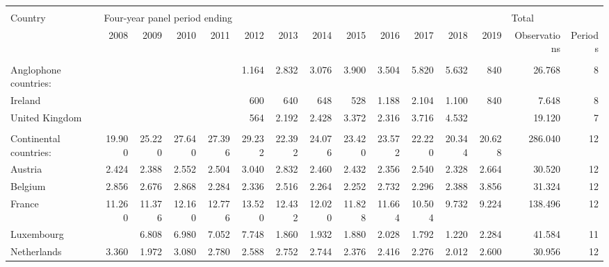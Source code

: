 \begin{tabular}{lrrrrrrrrrrrrrr}
   \\[-1.8ex]\hline \\ 
 [-1.8ex] \multicolumn{1}{l}{Country} & \multicolumn{12}{l}{Four-year panel period ending} & \multicolumn{2}{l}{Total} \\ 

                    \cmidrule(r){1-1} \cmidrule(r){2-13} \cmidrule(r){14-15} 

            & 2008 & 2009 & 2010 & 2011 & 2012 & 2013 & 2014 & 2015 & 2016 & 2017 & 2018 & 2019 & Observations & Periods \\ 
 \hline
\\[-1.8ex]
  Anglophone countries: &  &  &  &  & 1.164 & 2.832 & 3.076 & 3.900 & 3.504 & 5.820 & 5.632 & 840 & 26.768 &   8 \\ 
  \hspace{5mm} Ireland &  &  &  &  & 600 & 640 & 648 & 528 & 1.188 & 2.104 & 1.100 & 840 & 7.648 &   8 \\ 
  \hspace{5mm} United Kingdom &  &  &  &  & 564 & 2.192 & 2.428 & 3.372 & 2.316 & 3.716 & 4.532 &  & 19.120 &   7 \\ 
  \multicolumn{14}{l}{\phantom{empty}} \\
  Continental countries: & 19.900 & 25.220 & 27.640 & 27.396 & 29.232 & 22.392 & 24.076 & 23.420 & 23.572 & 22.220 & 20.344 & 20.628 & 286.040 &  12 \\ 
  \hspace{5mm} Austria & 2.424 & 2.388 & 2.552 & 2.504 & 3.040 & 2.832 & 2.460 & 2.432 & 2.356 & 2.540 & 2.328 & 2.664 & 30.520 &  12 \\ 
  \hspace{5mm} Belgium & 2.856 & 2.676 & 2.868 & 2.284 & 2.336 & 2.516 & 2.264 & 2.252 & 2.732 & 2.296 & 2.388 & 3.856 & 31.324 &  12 \\ 
  \hspace{5mm} France & 11.260 & 11.376 & 12.160 & 12.776 & 13.520 & 12.432 & 12.020 & 11.828 & 11.664 & 10.504 & 9.732 & 9.224 & 138.496 &  12 \\ 
  \hspace{5mm} Luxembourg &  & 6.808 & 6.980 & 7.052 & 7.748 & 1.860 & 1.932 & 1.880 & 2.028 & 1.792 & 1.220 & 2.284 & 41.584 &  11 \\ 
  \hspace{5mm} Netherlands & 3.360 & 1.972 & 3.080 & 2.780 & 2.588 & 2.752 & 2.744 & 2.376 & 2.416 & 2.276 & 2.012 & 2.600 & 30.956 &  12 \\ 

\end{tabular}
